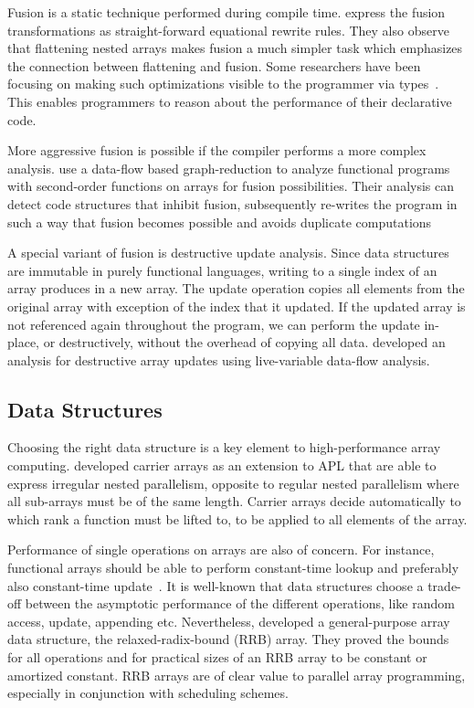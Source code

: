 \documentclass[a4paper]{article}
\begin{document}
Fusion is a static technique performed during compile
time. \citet{Chakravarty:2001:FAF:507635.507661} express the fusion
transformations as straight-forward equational rewrite rules. They
also observe that flattening nested arrays makes fusion a much simpler
task which emphasizes the connection between flattening and
fusion. Some researchers have been focusing on making such
optimizations visible to the programmer via
types~\cite{Lippmeier:2012:GPA:2364506.2364511}. This enables
programmers to reason about the performance of their declarative code.

More aggressive fusion is possible if the compiler performs a more
complex analysis. \citet{Henriksen:2013:TGA:2502323.2502328} use a
data-flow based graph-reduction to analyze functional programs with
second-order functions on arrays for fusion possibilities. Their
analysis can detect code structures that inhibit fusion, subsequently
re-writes the program in such a way that fusion becomes possible and
avoids duplicate computations

A special variant of fusion is destructive update analysis. Since data
structures are immutable in purely functional languages, writing to a
single index of an array produces in a new array. The update operation
copies all elements from the original array with exception of the
index that it updated. If the updated array is not referenced again
throughout the program, we can perform the update in-place, or
destructively, without the overhead of copying all
data. \citet{Sastry:1994:PDU:182409.182486} developed an analysis for
destructive array updates using live-variable data-flow analysis.

\subsection{Data Structures}
\label{sec:data-structures}

Choosing the right data structure is a key element to high-performance
array computing. \citet{Lowney:1981:CAI:567532.567533} developed
carrier arrays as an extension to APL that are able to express
irregular nested parallelism, opposite to regular nested parallelism
where all sub-arrays must be of the same length. Carrier arrays decide
automatically to which rank a function must be lifted to, to be
applied to all elements of the array.

Performance of single operations on arrays are also of concern. For
instance, functional arrays should be able to perform constant-time
lookup and preferably also constant-time update~\cite{47507}. It is
well-known that data structures choose a trade-off between the
asymptotic performance of the different operations, like random
access, update, appending etc. Nevertheless,
\citet{Stucki:2015:RVP:2784731.2784739} developed a general-purpose
array data structure, the relaxed-radix-bound (RRB) array. They proved
the bounds for all operations and for practical sizes of an RRB array
to be constant or amortized constant. RRB arrays are of clear value to
parallel array programming, especially in conjunction with scheduling
schemes.
\end{document}
